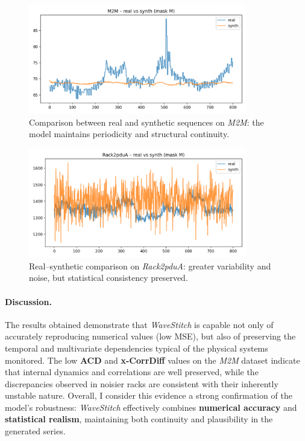 \begin{figure}[H]
\centering
\includegraphics[width=0.85\textwidth]{images/M2M_stitch_real_synth.png}
\caption{Comparison between real and synthetic sequences on \emph{M2M}: the model maintains periodicity and structural continuity.}
\label{fig:m2m_stitch_real_synth}
\end{figure}

\begin{figure}[H]
\centering
\includegraphics[width=0.85\textwidth]{images/Rack2pduA_stitch_real_synth.png}
\caption{Real–synthetic comparison on \emph{Rack2pduA}: greater variability and noise, but statistical consistency preserved.}
\label{fig:rack2pdua_stitch_real_synth}
\end{figure}

\paragraph{Discussion.}
The results obtained demonstrate that \emph{WaveStitch} is capable not only of accurately reproducing numerical values (low MSE), but also of preserving the temporal and multivariate dependencies typical of the physical systems monitored.  
The low \textbf{ACD} and \textbf{x-CorrDiff} values on the \emph{M2M} dataset indicate that internal dynamics and correlations are well preserved, while the discrepancies observed in noisier racks are consistent with their inherently unstable nature.  
Overall, I consider this evidence a strong confirmation of the model’s robustness:  
\emph{WaveStitch} effectively combines \textbf{numerical accuracy} and \textbf{statistical realism}, maintaining both continuity and plausibility in the generated series.


